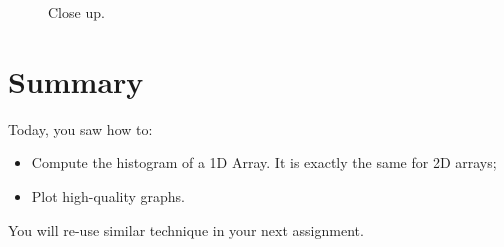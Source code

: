 \documentclass[english,a4paper,12pt,oneside]{article}
\begin{document}
\begin{figure}[!h]
\centering
\hfill
{}
\caption{\label{fig:zoom}Close up.}
\end{figure}

\section*{Summary}

Today, you saw how to:
\begin{itemize}
\item Compute the histogram of a 1D Array. It is exactly the same for 2D arrays;
\item Plot high-quality graphs.
\end{itemize}
You will re-use similar technique in your next assignment.

\end{document}
